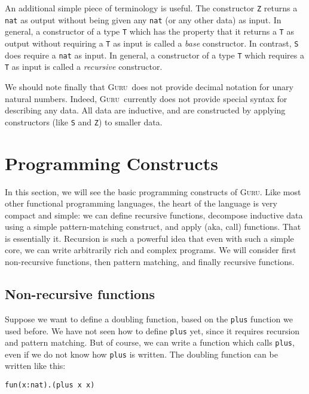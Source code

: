 \documentclass{book}[12pt]
\newcommand{\guru}[0]{\textsc{Guru}}
\begin{document}
An additional simple piece of terminology is useful.  The constructor
\texttt{Z} returns a \texttt{nat} as output without being given any
\texttt{nat} (or any other data) as input.  In general, a constructor
of a type \texttt{T} which has the property that it returns a
\texttt{T} as output without requiring a \texttt{T} as input is called
a \emph{base} constructor.  In contrast, \texttt{S} does require a
\texttt{nat} as input.  In general, a constructor of a type \texttt{T}
which requires a \texttt{T} as input is called a \emph{recursive}
constructor.

We should note finally that \guru\ does not provide decimal notation
for unary natural numbers.  Indeed, \guru\ currently does not provide
special syntax for describing any data.  All data are inductive, and
are constructed by applying constructors (like \texttt{S} and
\texttt{Z}) to smaller data.

\section{Programming Constructs}

In this section, we will see the basic programming constructs of
\textsc{Guru}.  Like most other functional programming languages, the
heart of the language is very compact and simple: we can define
recursive functions, decompose inductive data using a simple
pattern-matching construct, and apply (aka, call) functions.  That is
essentially it.  Recursion is such a powerful idea that even with such
a simple core, we can write arbitrarily rich and complex programs.  We
will consider first non-recursive functions, then pattern matching,
and finally recursive functions.

\subsection{Non-recursive functions}

Suppose we want to define a doubling function, based on the
\texttt{plus} function we used before.  We have not seen how to define
\texttt{plus} yet, since it requires recursion and pattern matching.
But of course, we can write a function which calls \texttt{plus},
even if we do not know how \texttt{plus} is written.  The doubling
function can be written like this:

\begin{verbatim}
fun(x:nat).(plus x x)
\end{verbatim}
\end{document}
